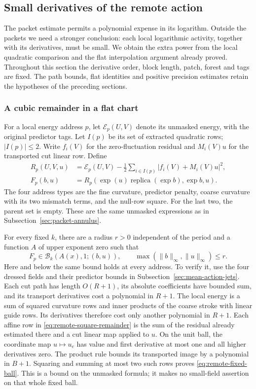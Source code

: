 \subsection{Small derivatives of the remote action}
\label{sec:remote-action-jets}
The packet estimate permits a polynomial expense in its logarithm.
Outside the packets we need a stronger conclusion: each local
logarithmic activity, together with its derivatives, must be small.
We obtain the extra power from the local quadratic comparison and
the flat interpolation argument already proved. Throughout this
section the derivative order, block length, patch, forest and tags
are fixed. The path bounds, flat identities and positive precision
estimates retain the hypotheses of the preceding sections.

\subsubsection{A cubic remainder in a flat chart}
For a local energy address $p$, let $\mathcal E_p(U,V)$ denote its
unmasked energy, with the original predictor tags. Let $I(p)$ be
its set of extracted quadratic rows; $|I(p)|\le2$. Write $f_i(V)$
for the zero-fluctuation residual and $M_i(V)u$ for the transported
cut linear row. Define
\begin{align}
 R_p(U,V,u)&=\mathcal E_p(U,V)
       -\frac12\sum_{i\in I(p)}|f_i(V)+M_i(V)u|^2,
       \label{eq:remote-square-remainder}\\
 F_p(b,u)&=R_p(\exp(u)\operatorname{replica}(\exp b),\exp b,u).
       \label{eq:remote-flat-remainder}
\end{align}
The four address types are the fine curvature, predictor penalty,
coarse curvature with its two mismatch terms, and the null-row
square. For the last two, the parent set is empty. These are the
same unmasked expressions as in Subsection~\ref{sec:packet-annulus}.

For every fixed $k$, there are a radius $r>0$ independent of the
period and a function $A$ of upper exponent zero such that
\begin{equation}\label{eq:remote-fixed-ball}
 F_p\in\mathcal B_k(A(x),1;(b,u)),\qquad
 \max(\|b\|_\infty,\|u\|_\infty)\le r.
\end{equation}
Here and below the same bound holds at every address. To verify it,
use the four dressed fields and their predictor bounds in
Subsection~\ref{sec:mean-action-jets}. Each cut path has length
$O(R+1)$, its absolute coefficients have bounded sum, and its
transport derivatives cost a polynomial in $R+1$. The local energy
is a sum of squared curvature rows and inner products of the
coarse stroke with linear guide rows. Its derivatives therefore
cost only another polynomial in $R+1$. Each affine row in
\eqref{eq:remote-square-remainder} is the sum of the residual
already estimated there and a cut linear map applied to $u$.
On the unit ball, the coordinate map $u\mapsto u_e$ has value and
first derivative at most one and all higher derivatives zero.
The product rule bounds its transported image by a polynomial
in $B+1$. Squaring and summing at most two such rows proves
\eqref{eq:remote-fixed-ball}. This is a bound on the unmasked
formula; it makes no small-field assertion on that whole fixed ball.

